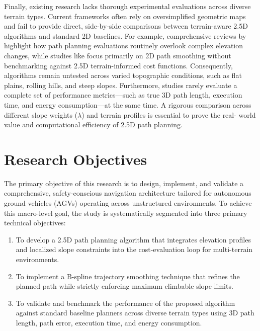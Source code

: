 Finally, existing research lacks thorough experimental evaluations across
diverse terrain types. Current frameworks often rely on oversimplified geometric
maps and fail to provide direct, side-by-side comparisons between terrain-aware
2.5D algorithms and standard 2D baselines. For example, comprehensive reviews by
\citet{Hameed_2021_comprehensivereview} highlight how path planning evaluations
routinely overlook complex elevation changes, while studies like
\citet{Song_2019_smoothedalgorithm} focus primarily on 2D path smoothing without
benchmarking against 2.5D terrain-informed cost functions. Consequently,
algorithms remain untested across varied topographic conditions, such as flat
plains, rolling hills, and steep slopes. Furthermore, studies rarely evaluate a
complete set of performance metrics—such as true 3D path length, execution time,
and energy consumption—at the same time. A rigorous comparison across different
slope weights ($\lambda$) and terrain profiles is essential to prove the real-
world value and computational efficiency of 2.5D path planning.

\section{Research Objectives}

The primary objective of this research is to design, implement, and validate a
comprehensive, safety-conscious navigation architecture tailored for autonomous
ground vehicles (AGVs) operating across unstructured environments. To achieve
this macro-level goal, the study is systematically segmented into three primary
technical objectives:

\begin{enumerate}
    \item To develop a 2.5D path planning algorithm that integrates elevation profiles and localized slope constraints into the cost-evaluation loop for multi-terrain environments.

\item To implement a B-spline trajectory smoothing technique that refines the
    planned path while strictly enforcing maximum climbable slope limits.

    \item To validate and benchmark the performance of the proposed algorithm against standard baseline planners across diverse terrain types using 3D path length, path error, execution time, and energy consumption.
\end{enumerate}

